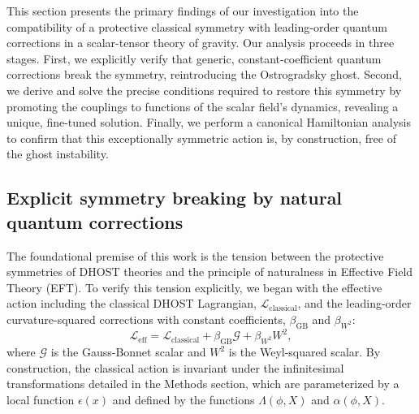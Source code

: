 \documentclass[twocolumn]{aastex631}
\begin{document}
This section presents the primary findings of our investigation into the compatibility of a protective classical symmetry with leading-order quantum corrections in a scalar-tensor theory of gravity. Our analysis proceeds in three stages. First, we explicitly verify that generic, constant-coefficient quantum corrections break the symmetry, reintroducing the Ostrogradsky ghost. Second, we derive and solve the precise conditions required to restore this symmetry by promoting the couplings to functions of the scalar field's dynamics, revealing a unique, fine-tuned solution. Finally, we perform a canonical Hamiltonian analysis to confirm that this exceptionally symmetric action is, by construction, free of the ghost instability.

\subsection{Explicit symmetry breaking by natural quantum corrections}
The foundational premise of this work is the tension between the protective symmetries of DHOST theories and the principle of naturalness in Effective Field Theory (EFT). To verify this tension explicitly, we began with the effective action including the classical DHOST Lagrangian, $\mathcal{L}_{\text{classical}}$, and the leading-order curvature-squared corrections with constant coefficients, $\beta_{\text{GB}}$ and $\beta_{W^2}$:
\begin{equation}
\mathcal{L}_{\text{eff}} = \mathcal{L}_{\text{classical}} + \beta_{\text{GB}} \mathcal{G} + \beta_{W^2} W^2,
\end{equation}
where $\mathcal{G}$ is the Gauss-Bonnet scalar and $W^2$ is the Weyl-squared scalar. By construction, the classical action is invariant under the infinitesimal transformations detailed in the Methods section, which are parameterized by a local function $\epsilon(x)$ and defined by the functions $\Lambda(\phi, X)$ and $\alpha(\phi, X)$.
\end{document}
